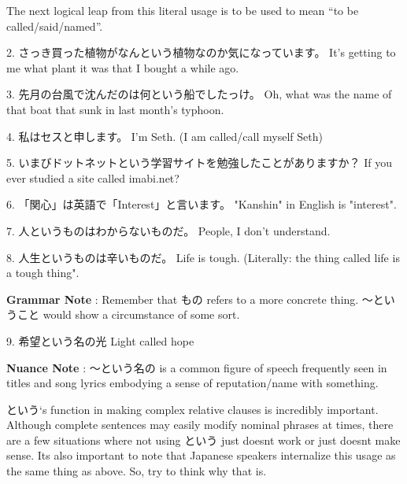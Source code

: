 \par{ The next logical leap from this literal usage is to be used to mean “to be called\slash said\slash named”. }

\par{2. さっき買った植物がなんという植物なのか気になっています。 \hfill\break
It's getting to me what plant it was that I bought a while ago. }
 
\par{3. 先月の台風で沈んだのは何という船でしたっけ。 \hfill\break
Oh, what was the name of that boat that sunk in last month's typhoon. }
 
\par{4. 私はセスと申します。 \hfill\break
I'm Seth. (I am called\slash call myself Seth) }
 
\par{5. いまびドットネットという学習サイトを勉強したことがありますか？ \hfill\break
If you ever studied a site called imabi.net? }
 
\par{6. 「関心」は英語で「Interest」と言います。 \hfill\break
"Kanshin" in English is "interest". }
 
\par{7. 人というものはわからないものだ。 \hfill\break
People, I don't understand. }
 
\par{8. 人生というものは辛いものだ。 \hfill\break
Life is tough. (Literally: the thing called life is a tough thing". }
 
\par{\textbf{Grammar Note }: Remember that もの refers to a more concrete thing. ～ということ would show a circumstance of some sort. }
 
\par{9. 希望という名の光 \hfill\break
Light called hope }
 
\par{\textbf{Nuance Note }: ～という名の is a common figure of speech frequently seen in titles and song lyrics embodying a sense of reputation\slash name with something. }

\par{  という‘s function in making complex relative clauses is incredibly important. Although complete sentences may easily modify nominal phrases at times, there are a few situations where not using という just doesn\textquotesingle t work or just doesn\textquotesingle t make sense. It\textquotesingle s also important to note that Japanese speakers internalize this usage as the same thing as above. So, try to think why that is. }
 
